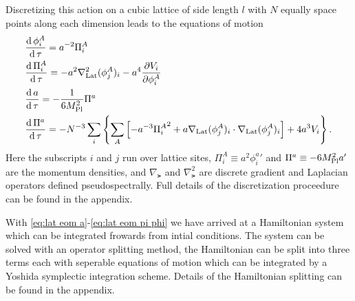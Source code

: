 Discretizing this action on a cubic lattice of side length $l$ with $N$ equally space points along each dimension leads to the equations of motion
\begin{align}
  & \frac{\mathrm{d}\,\phi^A_i}{\mathrm{d}\,\tau} = a^{-2}\Pi^A_i  \label{eq:lat eom a}\\
  & \frac{\mathrm{d}\,\Pi^A_i}{\mathrm{d}\,\tau} = -a^2\nabla^2_{\mathrm{Lat}}(\phi^A_j)_i -a^4\frac{\partial V_i}{\partial \phi^A_i}  \label{eq:lat eom pi a}\\
  & \frac{\mathrm{d}\, a}{\mathrm{d}\,\tau} = -\frac{1}{6M_{\mathrm{Pl}}^2}\Pi^a  \label{eq:lat eom phi}\\
  & \frac{\mathrm{d}\,\Pi^a}{\mathrm{d}\,\tau} = -N^{-3}\sum_i\left\{
  \sum_A\left[-a^{-3}{\Pi^A_i}^2 + a\nabla_{\mathrm{Lat}}(\phi^A_j)_i\cdot\nabla_{\mathrm{Lat}}(\phi^A_j)_i \right]
  + 4a^3V_i\right\}.  \label{eq:lat eom pi phi}  
\end{align}
Here the subscripts $i$ and $j$ run over lattice sites, $\Pi^A_i \equiv a^2{\phi^a_i}'$ and $\Pi^a \equiv -6M_{\mathrm{Pl}}^2a'$ are the momentum densities, and $\nabla_\lat$ and $\nabla^2_\lat$ are discrete gradient and Laplacian operators defined pseudospectrally.
Full details of the discretization proceedure can be found in the appendix.



With \eqref{eq:lat eom a}-\eqref{eq:lat eom pi phi} we have arrived at a Hamiltonian system which can be integrated frowards from intial conditions.
The system can be solved with an operator splitting method, the Hamiltonian can be split into three terms each with seperable equations of motion which can be integrated by a Yoshida symplectic integration scheme.
Details of the Hamiltonian splitting can be found in the appendix.


